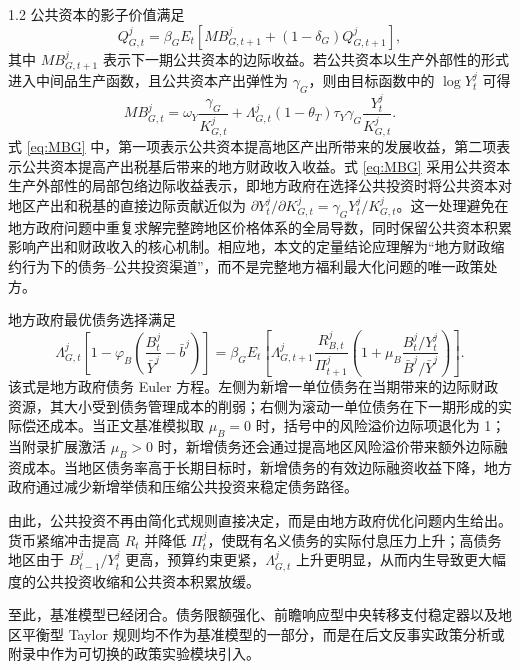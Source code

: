 \documentclass[12pt,UTF8]{ctexart}
\begin{document}
\begin{spacing}{1.2}
		公共资本的影子价值满足
		\begin{equation}
			Q_{G,t}^j
			=
			\beta_G E_t
			\left[
			MB_{G,t+1}^j
			+
			(1-\delta_G)Q_{G,t+1}^j
			\right],
			\label{eq:QG_euler}
		\end{equation}
		其中 $MB_{G,t+1}^j$ 表示下一期公共资本的边际收益。若公共资本以生产外部性的形式进入中间品生产函数，且公共资本产出弹性为 $\gamma_G$，则由目标函数中的 $\log Y_t^j$ 可得
		\begin{equation}
			MB_{G,t}^j
			=
			\omega_Y\frac{\gamma_G}{K_{G,t}^j}
			+
			\Lambda_{G,t}^j(1-\theta_T)\tau_Y
			\gamma_G\frac{Y_t^j}{K_{G,t}^j}.
			\label{eq:MBG}
		\end{equation}
		式 \eqref{eq:MBG} 中，第一项表示公共资本提高地区产出所带来的发展收益，第二项表示公共资本提高产出税基后带来的地方财政收入收益。式 \eqref{eq:MBG} 采用公共资本生产外部性的局部包络边际收益表示，即地方政府在选择公共投资时将公共资本对地区产出和税基的直接边际贡献近似为 $\partial Y_t^j/\partial K_{G,t}^j=\gamma_GY_t^j/K_{G,t}^j$。这一处理避免在地方政府问题中重复求解完整跨地区价格体系的全局导数，同时保留公共资本积累影响产出和财政收入的核心机制。相应地，本文的定量结论应理解为“地方财政缩约行为下的债务--公共投资渠道”，而不是完整地方福利最大化问题的唯一政策处方。

		地方政府最优债务选择满足
		\begin{equation}
			\Lambda_{G,t}^j
			\left[
			1
			-\varphi_B
			\left(
			\frac{B_t^j}{\bar Y^j}-\bar b^j
			\right)
			\right]
			=
			\beta_G E_t
			\left[
			\Lambda_{G,t+1}^j
			\frac{R_{B,t}^j}{\Pi_{t+1}^j}
			\left(
			1+
			\mu_B
			\frac{B_t^j/Y_t^j}{\bar B^j/\bar Y^j}
			\right)
			\right].
			\label{eq:B_FOC}
		\end{equation}
		该式是地方政府债务 Euler 方程。左侧为新增一单位债务在当期带来的边际财政资源，其大小受到债务管理成本的削弱；右侧为滚动一单位债务在下一期形成的实际偿还成本。当正文基准模拟取 $\mu_B=0$ 时，括号中的风险溢价边际项退化为 1；当附录扩展激活 $\mu_B>0$ 时，新增债务还会通过提高地区风险溢价带来额外边际融资成本。当地区债务率高于长期目标时，新增债务的有效边际融资收益下降，地方政府通过减少新增举债和压缩公共投资来稳定债务路径。
		
		由此，公共投资不再由简化式规则直接决定，而是由地方政府优化问题内生给出。货币紧缩冲击提高 $R_t$ 并降低 $\Pi_t^j$，使既有名义债务的实际付息压力上升；高债务地区由于 $B_{t-1}^j/Y_t^j$ 更高，预算约束更紧，$\Lambda_{G,t}^j$ 上升更明显，从而内生导致更大幅度的公共投资收缩和公共资本积累放缓。
		
		至此，基准模型已经闭合。债务限额强化、前瞻响应型中央转移支付稳定器以及地区平衡型 Taylor 规则均不作为基准模型的一部分，而是在后文反事实政策分析或附录中作为可切换的政策实验模块引入。
		

\end{spacing}
\end{document}
